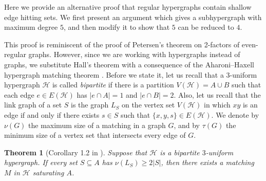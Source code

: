 \documentclass[11pt, a4paper]{article}
\newtheorem{theorem}{Theorem}
\numberwithin{theorem}{section} %
\theoremstyle{remark}
\theoremstyle{definition}
\def\cH{\mathcal{H}}
\begin{document}
Here we provide an alternative proof that regular hypergraphs contain shallow edge hitting sets. We first present an argument which gives a subhypergraph with maximum degree $5$, and then modify it to show that $5$ can be reduced to $4$.

This proof is reminiscent of the proof of Petersen's theorem on 2-factors of even-regular graphs. However, since we are working with hypergraphs instead of graphs, we substitute Hall's theorem with a consequence of the Aharoni--Haxell hypergraph matching theorem \cite{AharoniHaxell00}. Before we state it, let us recall that a $3$-uniform hypergraph $\cH$ is called \textit{bipartite} if there is a partition $V(\cH)=A\cup B$ such that each edge $e\in E(\cH)$ has $|e\cap A|=1$ and $|e\cap B|=2$. Also, let us recall that the link graph of a set $S$ is the graph $L_S$ on the vertex set $V(\cH)$ in which $xy$ is an edge if and only if there exists $s\in S$ such that $\{x, y, s\}\in E(\cH)$.
We denote by $\nu(G)$ the maximum size of a matching in a graph $G$, and by $\tau(G)$ the minimum size of a vertex set that intersects every edge of $G$.

\begin{theorem}[Corollary 1.2 in \cite{AharoniHaxell00}]\label{thm:hypergraph_matching}
Suppose that $\cH$ is a bipartite $3$-uniform hypergraph. If every set $S\subseteq A$ has $\nu(L_S)\geq 2|S|$, then there exists a matching $M$ in $\cH$ saturating $A$.
\end{theorem}
\end{document}
